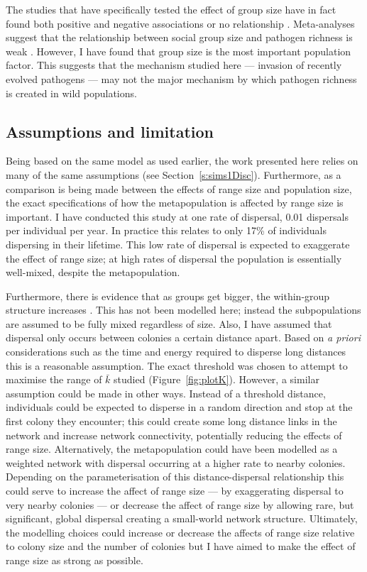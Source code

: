 The studies that have specifically tested the effect of group size have in fact found both positive \cite{vitone2004body} and negative associations \cite{gay2014parasite} or no relationship \cite{ezenwa2006host}.
Meta-analyses suggest that the relationship between social group size and pathogen richness is weak \cite{rifkin2012animals}.
However, I have found that group size is the most important population factor.
This suggests that the mechanism studied here --- invasion of recently evolved pathogens --- may not the major mechanism by which pathogen richness is created in wild populations.



\subsection{Assumptions and limitation}

Being based on the same model as used earlier, the work presented here relies on many of the same assumptions (see Section~\ref{s:sims1Disc}).
Furthermore, as a comparison is being made between the effects of range size and population size, the exact specifications of how the metapopulation is affected by range size is important.
I have conducted this study at one rate of dispersal, 0.01 dispersals per individual per year.
In practice this relates to only 17\% of individuals dispersing in their lifetime.
This low rate of dispersal is expected to exaggerate the effect of range size; at high rates of dispersal the population is essentially well-mixed, despite the metapopulation.

Furthermore, there is evidence that as groups get bigger, the within-group structure increases \cite{nunn2015infectious}.
This has not been modelled here; instead the subpopulations are assumed to be fully mixed regardless of size.
Also, I have assumed that dispersal only occurs between colonies a certain distance apart.
Based on \emph{a priori} considerations such as the time and energy required to disperse long distances this is a reasonable assumption.
The exact threshold was chosen to attempt to maximise the range of $\bar{k}$ studied (Figure~\ref{fig:plotK}).
However, a similar assumption could be made in other ways.
Instead of a threshold distance, individuals could be expected to disperse in a random direction and stop at the first colony they encounter; this could create some long distance links in the network and increase network connectivity, potentially reducing the effects of range size.
Alternatively, the metapopulation could have been modelled as a weighted network with dispersal occurring at a higher rate to nearby colonies.
Depending on the parameterisation of this distance-dispersal relationship this could serve to increase the affect of range size --- by exaggerating dispersal to very nearby colonies --- or decrease the affect of range size by allowing rare, but significant, global dispersal creating a small-world network structure.
Ultimately, the modelling choices could increase or decrease the affects of range size relative to colony size and the number of colonies but I have aimed to make the effect of range size as strong as possible.





